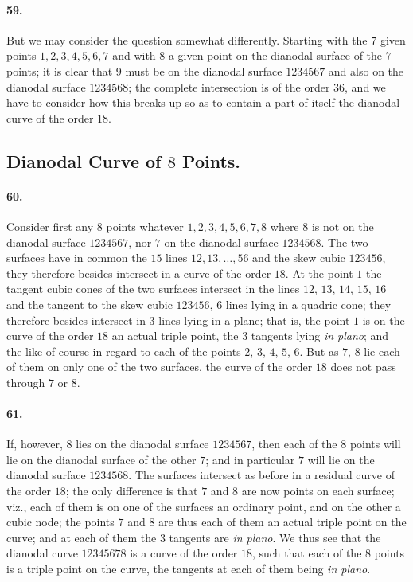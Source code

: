 \documentclass[11pt,a4paper]{article}
\begin{document}
\medskip

\paragraph{59.}
But we may consider the question somewhat differently. Starting with the $7$ given
points $1, 2, 3, 4, 5, 6, 7$ and with $8$ a given point on the dianodal surface of
the $7$ points; it is clear that $9$ must be on the dianodal surface $1234567$ and
also on the dianodal surface $1234568$; the complete intersection is of the order $36$,
and we have to consider how this breaks up so as to contain a part of itself the
dianodal curve of the order $18$.

\bigskip

\subsection*{Dianodal Curve of $8$ Points.}

\paragraph{60.}
Consider first any $8$ points whatever $1, 2, 3, 4, 5, 6, 7, 8$ where $8$ is not on
the dianodal surface $1234567$, nor $7$ on the dianodal surface $1234568$. The two
surfaces have in common the $15$ lines $12, 13, \ldots, 56$ and the skew cubic
$123456$, they therefore besides intersect in a curve of the order $18$. At the point
$1$ the tangent cubic cones of the two surfaces intersect in the lines $12$, $13$,
$14$, $15$, $16$ and the tangent to the skew cubic $123456$, $6$ lines lying in a
quadric cone; they therefore besides intersect in $3$ lines lying in a plane; that
is, the point $1$ is on the curve of the order $18$ an actual triple point, the $3$
tangents lying \textit{in plano}; and the like of course in regard to each of the
points $2$, $3$, $4$, $5$, $6$. But as $7$, $8$ lie each of them on only one of the
two surfaces, the curve of the order $18$ does not pass through $7$ or $8$.

\medskip

\paragraph{61.}
If, however, $8$ lies on the dianodal surface $1234567$, then each of the $8$ points
will lie on the dianodal surface of the other $7$; and in particular $7$ will lie on
the dianodal surface $1234568$. The surfaces intersect as before in a residual curve
of the order $18$; the only difference is that $7$ and $8$ are now points on each
surface; viz., each of them is on one of the surfaces an ordinary point, and on the
other a cubic node; the points $7$ and $8$ are thus each of them an actual triple
point on the curve; and at each of them the $3$ tangents are \textit{in plano}. We
thus see that the dianodal curve $12345678$ is a curve of the order $18$, such that
each of the $8$ points is a triple point on the curve, the tangents at each of them
being \textit{in plano}.
\end{document}
